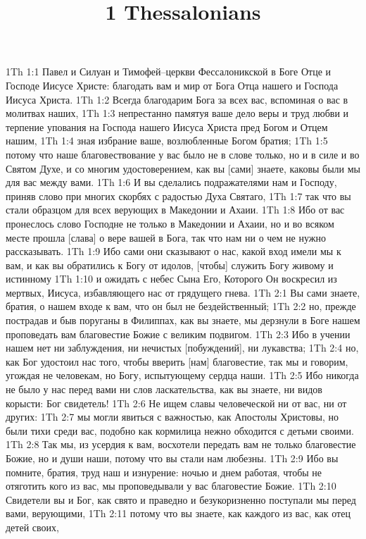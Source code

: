 

\title{1 Thessalonians}

1Th 1:1  Павел и Силуан и Тимофей--церкви Фессалоникской в Боге Отце и Господе Иисусе Христе: благодать вам и мир от Бога Отца нашего и Господа Иисуса Христа.
1Th 1:2  Всегда благодарим Бога за всех вас, вспоминая о вас в молитвах наших,
1Th 1:3  непрестанно памятуя ваше дело веры и труд любви и терпение упования на Господа нашего Иисуса Христа пред Богом и Отцем нашим,
1Th 1:4  зная избрание ваше, возлюбленные Богом братия;
1Th 1:5  потому что наше благовествование у вас было не в слове только, но и в силе и во Святом Духе, и со многим удостоверением, как вы [сами] знаете, каковы были мы для вас между вами.
1Th 1:6  И вы сделались подражателями нам и Господу, приняв слово при многих скорбях с радостью Духа Святаго,
1Th 1:7  так что вы стали образцом для всех верующих в Македонии и Ахаии.
1Th 1:8  Ибо от вас пронеслось слово Господне не только в Македонии и Ахаии, но и во всяком месте прошла [слава] о вере вашей в Бога, так что нам ни о чем не нужно рассказывать.
1Th 1:9  Ибо сами они сказывают о нас, какой вход имели мы к вам, и как вы обратились к Богу от идолов, [чтобы] служить Богу живому и истинному
1Th 1:10  и ожидать с небес Сына Его, Которого Он воскресил из мертвых, Иисуса, избавляющего нас от грядущего гнева.
1Th 2:1  Вы сами знаете, братия, о нашем входе к вам, что он был не бездейственный;
1Th 2:2  но, прежде пострадав и быв поруганы в Филиппах, как вы знаете, мы дерзнули в Боге нашем проповедать вам благовестие Божие с великим подвигом.
1Th 2:3  Ибо в учении нашем нет ни заблуждения, ни нечистых [побуждений], ни лукавства;
1Th 2:4  но, как Бог удостоил нас того, чтобы вверить [нам] благовестие, так мы и говорим, угождая не человекам, но Богу, испытующему сердца наши.
1Th 2:5  Ибо никогда не было у нас перед вами ни слов ласкательства, как вы знаете, ни видов корысти: Бог свидетель!
1Th 2:6  Не ищем славы человеческой ни от вас, ни от других:
1Th 2:7  мы могли явиться с важностью, как Апостолы Христовы, но были тихи среди вас, подобно как кормилица нежно обходится с детьми своими.
1Th 2:8  Так мы, из усердия к вам, восхотели передать вам не только благовестие Божие, но и души наши, потому что вы стали нам любезны.
1Th 2:9  Ибо вы помните, братия, труд наш и изнурение: ночью и днем работая, чтобы не отяготить кого из вас, мы проповедывали у вас благовестие Божие.
1Th 2:10  Свидетели вы и Бог, как свято и праведно и безукоризненно поступали мы перед вами, верующими,
1Th 2:11  потому что вы знаете, как каждого из вас, как отец детей своих,
